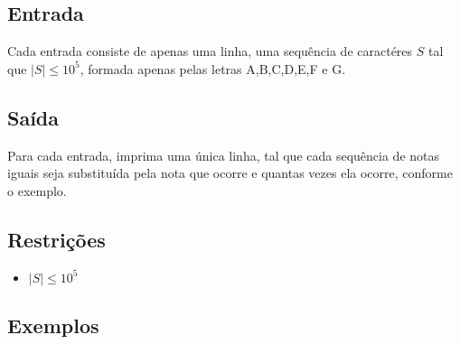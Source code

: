 \subsection*{Entrada}

Cada entrada consiste de apenas uma linha, uma sequência de caractéres $S$ tal que $|S| \leq 10^5$, formada apenas
pelas letras A,B,C,D,E,F e G.

\subsection*{Saída}
Para cada entrada, imprima uma única linha, tal que cada sequência de notas iguais seja substituída pela nota que
ocorre e quantas vezes ela ocorre, conforme o exemplo.


\subsection*{Restrições}
\begin{itemize}
  \item $|S| \leq 10^5$
\end{itemize}

\subsection*{Exemplos}

